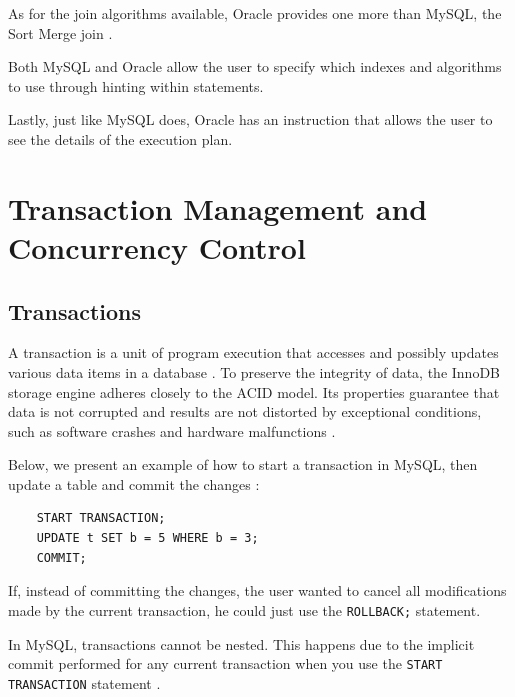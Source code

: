 \documentclass[12pt]{article}
\begin{document}
As for the join algorithms available, Oracle provides one more than MySQL, the Sort Merge join \parencite{JoinMethods}.

Both MySQL and Oracle allow the user to specify which indexes and algorithms to use through hinting within statements. 

Lastly, just like MySQL does, Oracle has an instruction that allows the user to see the details of the execution plan.
 




\newpage
\section{Transaction Management and Concurrency Control}
\label{transactionAndConcurrency}

\subsection{Transactions}
\label{transactions} 
A transaction is a unit of program execution that accesses and possibly
updates various data items in a database \parencite{AulaTransactions}. To preserve the integrity of data, the InnoDB storage engine adheres closely to the ACID model. Its properties guarantee that data is not corrupted and results are not distorted by exceptional conditions, such as software crashes and hardware malfunctions \parencite{innodbACID}.

\vspace{0.3cm}

\noindent Below, we present an example of how to start a transaction in MySQL, then update a table and commit the changes \parencite{transactionIsolationLevels}:

\begin{verbatim}
    START TRANSACTION;
    UPDATE t SET b = 5 WHERE b = 3;
    COMMIT;
\end{verbatim}

\noindent If, instead of committing the changes, the user wanted to cancel all modifications made by the current transaction, he could just use the \verb|ROLLBACK;| statement.

\vspace{0.3cm}

In MySQL, transactions cannot be nested. This happens due to the implicit commit performed for any current transaction when you use the \verb|START TRANSACTION| statement \parencite{implicitCommit}.
\end{document}
